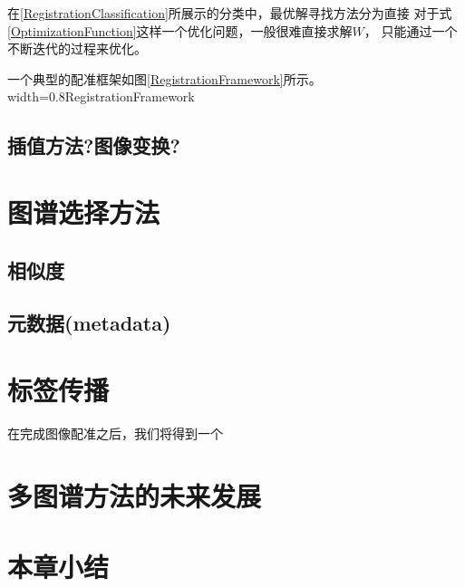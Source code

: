 在\ref{RegistrationClassification}所展示的分类中，最优解寻找方法分为直接
对于式\ref{OptimizationFunction}这样一个优化问题，一般很难直接求解$W$，
只能通过一个不断迭代的过程来优化。

一个典型的配准框架如图\ref{RegistrationFramework}所示。
%
{width=0.8\textwidth}{RegistrationFramework}

\subsection{插值方法?图像变换?}\label{SectionModality}

\section{图谱选择方法}

\subsection{相似度}
\subsection{元数据(metadata)}

\section{标签传播}
在完成图像配准之后，我们将得到一个




\section{多图谱方法的未来发展}

\section{本章小结}
